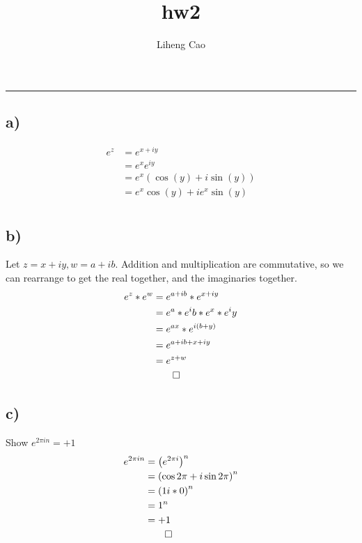 \documentclass[12pt]{article}
\title{hw2}
\author{Liheng Cao}
\begin{document}
\maketitle

\section{}\hrule
\subsection{a)}
\begin{align*}
	e^z &= e^{x+iy}\\
	&= e^x e^{iy}\\
	&= e^x \left( \cos{(y)} + i\sin{(y)}\right) \\
	&= e^x \cos{(y)} + i e^x \sin{(y)}\\
\end{align*}


\subsection{b)}

Let $z = x+iy, w = a+ib$. Addition and multiplication are commutative, so we can rearrange to get the real together, and the imaginaries together.
\begin{align*}
	e^z * e^w &= e^{a+ib} * e ^{x+iy}\\
	&= e^a * e^ib * e^x * e^iy\\
	&= e^{ax} * e^{i(b+y)}\\
	&= e^{a + ib + x + iy}\\
	&= e^{z+w}\\
	&\qed
\end{align*}

\subsection{c)}
Show $e^{2\pi i n} = +1$
\begin{align*}
	e^{2\pi i n} &= \left( e^{2\pi i}\right)^n\\
	&= \left( \cos{2\pi} + i\sin{2\pi}\right)^n\\
	&= \left( 1  i * 0\right)^n\\
	&= 1^n\\
	&= +1\\
	&\qed
\end{align*}
\end{document}
